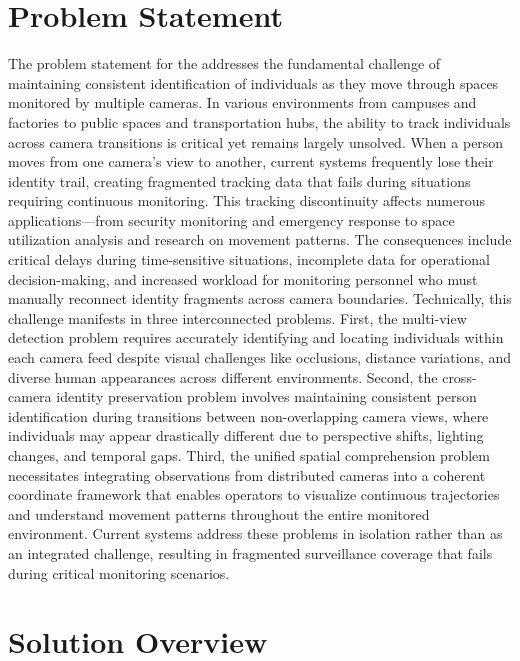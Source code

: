 \section{Problem Statement}
\label{section:problem-statement}

The problem statement for the \usevar{\srsTitle} addresses the fundamental challenge of maintaining consistent identification of individuals as they move through spaces monitored by multiple cameras. In various environments from campuses and factories to public spaces and transportation hubs, the ability to track individuals across camera transitions is critical yet remains largely unsolved. When a person moves from one camera's view to another, current systems frequently lose their identity trail, creating fragmented tracking data that fails during situations requiring continuous monitoring. This tracking discontinuity affects numerous applications—from security monitoring and emergency response to space utilization analysis and research on movement patterns. The consequences include critical delays during time-sensitive situations, incomplete data for operational decision-making, and increased workload for monitoring personnel who must manually reconnect identity fragments across camera boundaries.
Technically, this challenge manifests in three interconnected problems. First, the multi-view detection problem requires accurately identifying and locating individuals within each camera feed despite visual challenges like occlusions, distance variations, and diverse human appearances across different environments. Second, the cross-camera identity preservation problem involves maintaining consistent person identification during transitions between non-overlapping camera views, where individuals may appear drastically different due to perspective shifts, lighting changes, and temporal gaps. Third, the unified spatial comprehension problem necessitates integrating observations from distributed cameras into a coherent coordinate framework that enables operators to visualize continuous trajectories and understand movement patterns throughout the entire monitored environment. Current systems address these problems in isolation rather than as an integrated challenge, resulting in fragmented surveillance coverage that fails during critical monitoring scenarios.


\section{Solution Overview}
\label{section:solution-overview}

